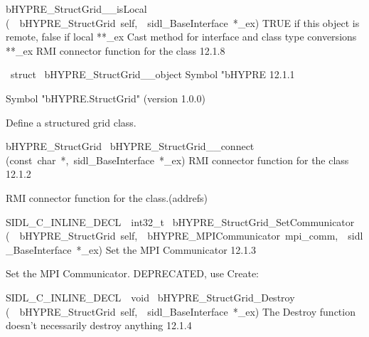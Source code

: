 \documentclass{article}
\begin{document}
\begin{cxxentry}
\begin{cxxentry}
\begin{cxxnames}
        {}
\label{cxx.12.1.20}
        {bHYPRE\_StructGrid\_\_isLocal}
        {(\ \ bHYPRE\_StructGrid\ self,\ \ sidl\_BaseInterface\ *\_ex)}
        {
TRUE if this object is remote, false if local}
        {}
\label{cxx.12.1.21}
        {**\_ex}
        {}
        {
Cast method for interface and class type conversions}
        {}
\label{cxx.12.1.22}
        {**\_ex}
        {}
        {
RMI connector function for the class}
        {12.1.8}
\end{cxxnames}
\begin{cxxvariable}
{\ struct\ }
        {bHYPRE\_StructGrid\_\_object}
        {}
        {
Symbol "bHYPRE}
        {12.1.1}
\begin{cxxdoc}

Symbol "bHYPRE.StructGrid" (version 1.0.0)

Define a structured grid class.
\end{cxxdoc}
\end{cxxvariable}
\begin{cxxfunction}
{bHYPRE\_StructGrid\ }
        {bHYPRE\_StructGrid\_\_connect}
        {(const\ char\ *,\ sidl\_BaseInterface\ *\_ex)}
        {
RMI connector function for the class}
        {12.1.2}
\begin{cxxdoc}

RMI connector function for the class.(addrefs)
\end{cxxdoc}
\end{cxxfunction}
\begin{cxxfunction}
{SIDL\_C\_INLINE\_DECL\ \ int32\_t\ }
        {bHYPRE\_StructGrid\_SetCommunicator}
        {(\ \ bHYPRE\_StructGrid\ self,\ \ bHYPRE\_MPICommunicator\ mpi\_comm,\ \ sidl\_BaseInterface\ *\_ex)}
        {
Set the MPI Communicator}
        {12.1.3}
\begin{cxxdoc}

Set the MPI Communicator.
DEPRECATED, use Create:
\end{cxxdoc}
\end{cxxfunction}
\begin{cxxfunction}
{SIDL\_C\_INLINE\_DECL\ \ void\ }
        {bHYPRE\_StructGrid\_Destroy}
        {(\ \ bHYPRE\_StructGrid\ self,\ \ sidl\_BaseInterface\ *\_ex)}
        {
The Destroy function doesn't necessarily destroy anything}
        {12.1.4}
\begin{cxxdoc}


\end{cxxdoc}
\end{cxxfunction}
\end{cxxentry}
\end{cxxentry}
\end{document}
